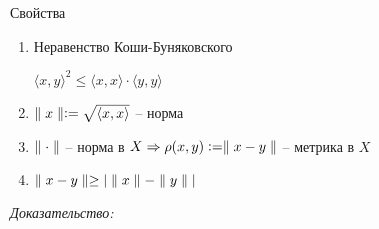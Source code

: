 \documentclass[12pt]{article}
\newcommand{\q}[1]{\langle #1 \rangle}
\begin{document}
\begin{theo}{Свойства}
    \begin{enumerate}
        \item Неравенство Коши-Буняковского
        
        $\q{x, y}^2 \leq \q{x, x} \cdot \q{y, y}$

        \item $\parl{x} := \sqrt{\q{x, x}}$ -- норма
        \item $\parallel \cdot \parallel$ -- норма в $X \Rightarrow \rho(x, y) := \parallel x - y \parallel$ -- метрика в $X$
        \item $\parallel x - y \parallel \geq |\parallel x \parallel - \parallel y \parallel|$
    \end{enumerate}
\end{theo}

\newpage

\textit{Доказательство:}
\end{document}
